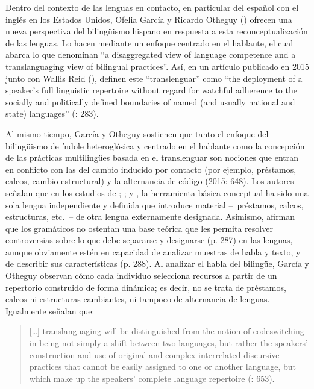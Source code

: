 \documentclass[output=paper]{langscibook}
\begin{document}
Dentro del contexto de las lenguas en contacto, en particular del español con el inglés en los Estados Unidos, Ofelia García y Ricardo Otheguy (\citeyear{GarcíaOtheguy2015}) ofrecen una nueva perspectiva del bilingüismo hispano en respuesta a esta reconceptualización de las lenguas. Lo hacen mediante un enfoque centrado en el hablante, el cual abarca lo que denominan “a disaggregated view of language competence and a translanguaging view of bilingual practices”. Así, en un artículo publicado en 2015 junto con Wallis Reid (\citealt{OtheguyGarcíaReid2015}), definen este “translenguar” como “the deployment of a speaker’s full linguistic repertoire without regard for watchful adherence to the socially and politically defined boundaries of named (and usually national and state) languages” (\citeyear{OtheguyGarcíaReid2015}: 283).

Al mismo tiempo, García y Otheguy sostienen que tanto el enfoque del bilingüismo de índole heteroglósica y centrado en el hablante como la concepción de las prácticas multilingües basada en el translenguar son nociones que entran en conflicto con las del cambio inducido por contacto (por ejemplo, préstamos, calcos, cambio estructural) y la alternancia de código (2015: 648). Los autores señalan que en los estudios de \citet{Weinreich1953}; \citet{Haugen1953}; \citet{ThomasonKaufman1988} y \citet{Winford2003book}, la herramienta básica conceptual ha sido una sola lengua independiente y definida que introduce material -- préstamos, calcos, estructuras, etc. -- de otra lengua externamente designada. Asimismo, \citet{OtheguyGarcíaReid2015} afirman que los gramáticos no ostentan una base teórica que les permita resolver controversias sobre lo que debe separarse y designarse (p. 287) en las lenguas, aunque obviamente estén en capacidad de analizar muestras de habla y texto, y de describir sus características (p. 288). Al analizar el habla del bilingüe, García y Otheguy observan cómo cada individuo selecciona recursos a partir de un repertorio construido de forma dinámica; es decir, no se trata de préstamos, calcos ni estructuras cambiantes, ni tampoco de alternancia de lenguas. Igualmente señalan que:

\begin{quote}
[…] translanguaging will be distinguished from the notion of codeswitching in being not simply a shift between two languages, but rather the speakers’ construction and use of original and complex interrelated discursive prac\-tices that cannot be easily assigned to one or another language, but which make up the speakers’ complete language repertoire (\citealt{GarcíaOtheguy2015}: 653).
\end{quote}
\end{document}
